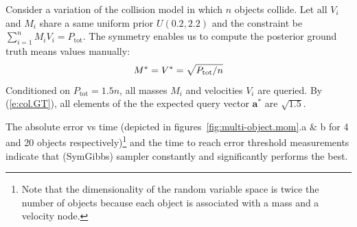 \documentclass[]{article}
\newcommand{\bvec}[1]{\textbf{#1}}
\begin{document}
Consider a variation of the collision model in which $n$ objects collide.  
Let all $V_i$ and $M_i$ share a same uniform prior $U(0.2, 2.2)$ and the constraint be $\sum_{i=1}^n{M_i V_i} = P_{\text{tot}}$. 
The symmetry enables us to compute the posterior ground truth means  values  manually:
\begin{equation}\footnotesize
\label{e:col.GT}
M^* = V^* = \sqrt{P_{\text{tot}} / n} %
\end{equation}
Conditioned on $P_{\text{tot}} = 1.5 n$, all masses $M_i$ and velocities  $V_i$ are queried. 
By (\ref{e:col.GT}), all elements of the the expected query vector $\bvec{a}^*$ are $\sqrt{1.5}$.

The absolute error vs time (depicted in figures~\ref{fig:multi-object.mom}.a \& b for 4 and 20 objects respectively)\footnote{
Note that the dimensionality of the random variable space is twice the number of objects because each object is associated with a mass and a velocity node. %
} and the time to reach error threshold measurements indicate that (SymGibbs) sampler constantly and significantly performs the best.
\end{document}
